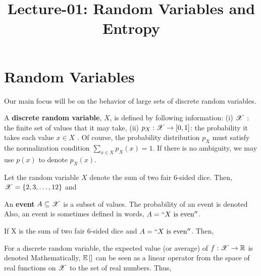 \documentclass[letterpaper,10pt,english]{article}
\title{Lecture-01: Random Variables and Entropy}
\author{}
\begin{document}
\maketitle

\section{Random Variables} 

Our main focus will be on the behavior of large sets of discrete random variables. 
\begin{defn} 
A \textbf{discrete random variable}, $X$, is defined by following information: 
(i) $\mathscr{X}$ : the finite set of values that it may take, 
(ii) $p_X : \mathscr{X} \to [0, 1]$: the probability it takes each value $x \in X$ . 
Of course, the probability distribution $p_X$ must satisfy the normalization condition $\sum_{x \in X}p_X (x) = 1$. 
If there is no ambiguity, we may use $p(x)$ to denote $p_X (x)$. 
\end{defn}
\begin{exmp}
Let the random variable $X$ denote the sum of two fair 6-sided dice. 
Then, $\mathscr{X} = \left\{2, 3, \dots, 12\right\}$ and 
\end{exmp}
\begin{defn}
An \textbf{event} $A \subseteq \mathscr{X}$ is a subset of values. 
The probability of an event is denoted 
Also, an event is sometimes defined in words, $A = ``X \text{ is even}''$.
\end{defn}
\begin{exmp} 
If X is the sum of two fair 6-sided dice and $A = ``X \text{ is even}''$. Then, 
\end{exmp}
\begin{defn} 
For a discrete random variable, the expected value (or average) of $f : \mathscr{X} \to \mathbb{R}$ is denoted
Mathematically, $\mathbb{E}\left[\right]$ can be seen as a linear operator from the space of real functions on $\mathscr{X}$ to the set of real numbers. 
Thus,
\end{defn}
\end{document}

